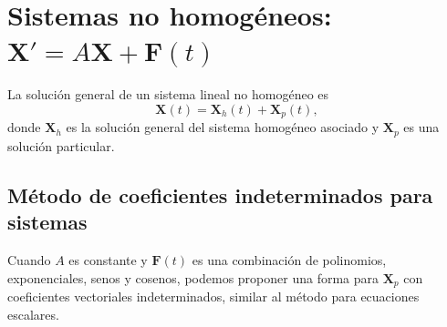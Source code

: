 \section{Sistemas no homogéneos: $\mathbf{X}'=A\mathbf{X}+\mathbf{F}(t)$}

La solución general de un sistema lineal no homogéneo es
\[
\mathbf{X}(t)=\mathbf{X}_h(t)+\mathbf{X}_p(t),
\]
donde $\mathbf{X}_h$ es la solución general del sistema homogéneo asociado y $\mathbf{X}_p$ es una solución particular.

\subsection{Método de coeficientes indeterminados para sistemas}

Cuando $A$ es constante y $\mathbf{F}(t)$ es una combinación de polinomios, exponenciales, senos y cosenos, podemos proponer una forma para $\mathbf{X}_p$ con coeficientes vectoriales indeterminados, similar al método para ecuaciones escalares.

